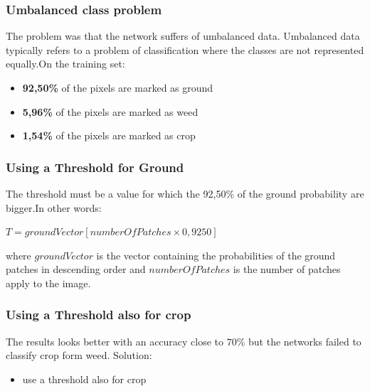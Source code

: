 \documentclass{beamer}
\begin{document}
\begin{frame}
\frametitle{Umbalanced class problem}

The problem was that the network suffers of umbalanced data. Umbalanced data typically refers to a problem of classification where the classes are not represented equally.On the training set:

\begin{itemize}

	\item \textbf{92,50\%} of the pixels are marked as ground
	\item \textbf{5,96\%} of the pixels are marked as weed
	\item \textbf{1,54\%} of the pixels are marked as crop

\end{itemize}


\end{frame}

\begin{frame}
\frametitle{Using a Threshold for Ground}

 The threshold must be a value for which the 92,50\% of the ground probability are bigger.In other words:

\begin{center}
	$ T = groundVector[numberOfPatches\times 0,9250] $
\end{center}

where $groundVector $ is the vector containing the probabilities of the ground patches in descending order and $numberOfPatches $ is the number of patches apply to the image.

\end{frame}

\begin{frame}
\frametitle{Using a Threshold also for crop}
The results looks better with an accuracy close to $ 70\% $ but the networks failed to classify crop form weed.
Solution:
\begin{itemize}
	\item use a threshold also for crop
\end{itemize}

\end{frame}
\end{document}
